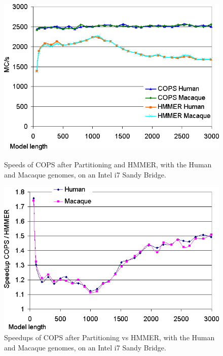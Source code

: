 \begin{figure}[h!]
    \begin{minipage}{0.48\linewidth}
		\centering
		\includegraphics[scale=0.46]{graphics/partitions-larissa-runtimes.png}
		\caption[Speeds for the Inter-task vectorization on an Intel i7 Sandy Bridge] 
		{Speeds of COPS after Partitioning and HMMER, with the Human and Macaque genomes, on an Intel i7 Sandy Bridge.}
		\label{partitions-larissa-runtimes}
    \end{minipage}
    \hspace{0.04\linewidth}
    \begin{minipage}{0.48\linewidth}
		\centering
		\includegraphics[scale=0.46]{graphics/partitions-larissa-speedups.png}
		\caption[Speedups for the Inter-task vectorization on an Intel i7 Sandy Bridge]
		{Speedups of COPS after Partitioning vs HMMER, with the Human and Macaque genomes, on an Intel i7 Sandy Bridge.}
		\label{partitions-larissa-speedups}
    \end{minipage}
\end{figure} 

